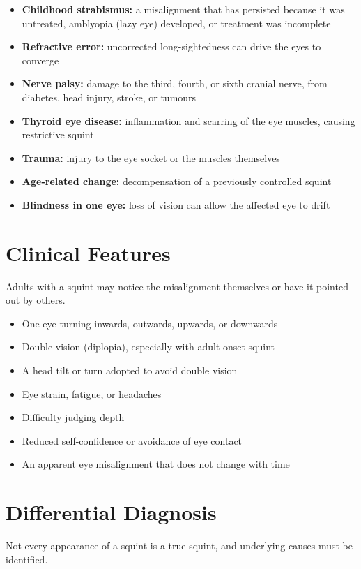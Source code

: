 \begin{itemize}
    \item \textbf{Childhood strabismus:} a misalignment that has persisted because it was untreated, amblyopia (lazy eye) developed, or treatment was incomplete
    \item \textbf{Refractive error:} uncorrected long-sightedness can drive the eyes to converge
    \item \textbf{Nerve palsy:} damage to the third, fourth, or sixth cranial nerve, from diabetes, head injury, stroke, or tumours
    \item \textbf{Thyroid eye disease:} inflammation and scarring of the eye muscles, causing restrictive squint
    \item \textbf{Trauma:} injury to the eye socket or the muscles themselves
    \item \textbf{Age-related change:} decompensation of a previously controlled squint
    \item \textbf{Blindness in one eye:} loss of vision can allow the affected eye to drift
\end{itemize}

\section*{Clinical Features}
Adults with a squint may notice the misalignment themselves or have it pointed out by others.

\begin{itemize}
    \item One eye turning inwards, outwards, upwards, or downwards
    \item Double vision (diplopia), especially with adult-onset squint
    \item A head tilt or turn adopted to avoid double vision
    \item Eye strain, fatigue, or headaches
    \item Difficulty judging depth
    \item Reduced self-confidence or avoidance of eye contact
    \item An apparent eye misalignment that does not change with time
\end{itemize}

\section*{Differential Diagnosis}
Not every appearance of a squint is a true squint, and underlying causes must be identified.

